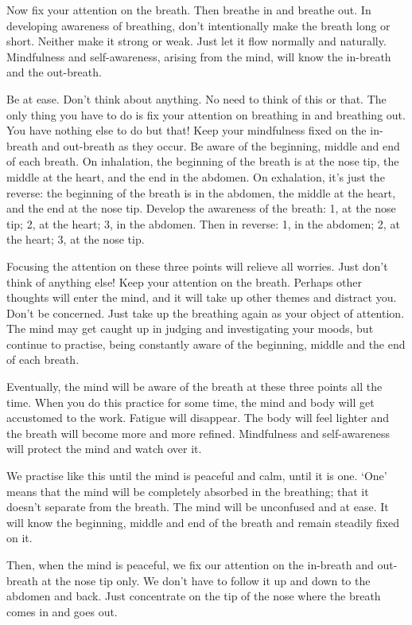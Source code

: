  Now fix your attention on the breath. Then breathe in and breathe out. In developing awareness of breathing, don't intentionally make the breath long or short. Neither make it strong or weak. Just let it flow normally and naturally. Mindfulness and self-awareness, arising from the mind, will know the in-breath and the out-breath. 

 Be at ease. Don't think about anything. No need to think of this or that. The only thing you have to do is fix your attention on breathing in and breathing out. You have nothing else to do but that! Keep your mindfulness fixed on the in-breath and out-breath as they occur. Be aware of the beginning, middle and end of each breath. On inhalation, the beginning of the breath is at the nose tip, the middle at the heart, and the end in the abdomen. On exhalation, it's just the reverse: the beginning of the breath is in the abdomen, the middle at the heart, and the end at the nose tip. Develop the awareness of the breath: 1, at the nose tip; 2, at the heart; 3, in the abdomen. Then in reverse: 1, in the abdomen; 2, at the heart; 3, at the nose tip. 

 Focusing the attention on these three points will relieve all worries. Just don't think of anything else! Keep your attention on the breath. Perhaps other thoughts will enter the mind, and it will take up other themes and distract you. Don't be concerned. Just take up the breathing again as your object of attention. The mind may get caught up in judging and investigating your moods, but continue to practise, being constantly aware of the beginning, middle and the end of each breath. 

 Eventually, the mind will be aware of the breath at these three points all the time. When you do this practice for some time, the mind and body will get accustomed to the work. Fatigue will disappear. The body will feel lighter and the breath will become more and more refined. Mindfulness and self-awareness will protect the mind and watch over it. 

 We practise like this until the mind is peaceful and calm, until it is one. `One' means that the mind will be completely absorbed in the breathing; that it doesn't separate from the breath. The mind will be unconfused and at ease. It will know the beginning, middle and end of the breath and remain steadily fixed on it. 

 Then, when the mind is peaceful, we fix our attention on the in-breath and out-breath at the nose tip only. We don't have to follow it up and down to the abdomen and back. Just concentrate on the tip of the nose where the breath comes in and goes out. 

